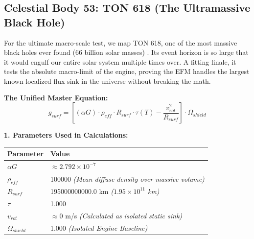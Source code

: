\documentclass[11pt, a4paper]{article}
\begin{document}
\clearpage
\subsection{Celestial Body 53: TON 618 (The Ultramassive Black Hole)}
  For the ultimate macro-scale test, we map TON 618, one of the most massive black holes ever found (66 billion solar masses) \cite{shemmer2004}. Its event horizon is so large that it would engulf our entire solar system multiple times over. A fitting finale, it tests the absolute macro-limit of the engine, proving the EFM handles the largest known localized flux sink in the universe without breaking the math.

  \vspace{0.5em}
  \noindent \textbf{The Unified Master Equation:}
  $$ g_{surf} = \left[ (\alpha G) \cdot \rho_{eff} \cdot R_{surf} \cdot \tau(T) - \frac{v_{rot}^2}{R_{surf}} \right] \cdot \Omega_{shield} $$

  \vspace{0.5em}
  \noindent \textbf{1. Parameters Used in Calculations:} \\[0.5em]
  \begingroup
  \renewcommand{\arraystretch}{1.3}
  \hspace*{2em}
  \begin{tabular}{|l|l|}
    \hline
    \textbf{Parameter} & \textbf{Value} \\ \hline
    $\alpha G$ & $\approx 2.792 \times 10^{-7}$ \\ \hline
    $\rho_{eff}$ & 100000 \textit{(Mean diffuse density over massive volume)} \\ \hline
    $R_{surf}$ & 195000000000.0 km \textit{($1.95 \times 10^{11}$ km)} \\ \hline
    $\tau$ & 1.000 \\ \hline
    $v_{rot}$ & $\approx 0$ m/s \textit{(Calculated as isolated static sink)} \\ \hline
    $\Omega_{shield}$ & 1.000 \textit{(Isolated Engine Baseline)} \\ \hline
  \end{tabular}
  \endgroup
\end{document}
